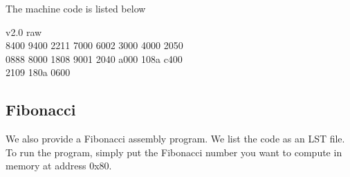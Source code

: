 \documentclass[12pt, letter]{article}
\begin{document}
	\bigskip
	
	The machine code is listed below
	\begin{tcolorbox}[colback = bg, boxrule = 0pt]
		v2.0 raw \\
		8400 9400 2211 7000 6002 3000 4000 2050 \\
		0888 8000 1808 9001 2040 a000 108a c400 \\
		2109 180a 0600
	\end{tcolorbox}
	
	\bigskip
	
	\subsection{Fibonacci}
	We also provide a Fibonacci assembly program. We list the code as an LST file. To run the program, simply put the Fibonacci number you want to compute in memory at address 0x80.  
	
\end{document}
